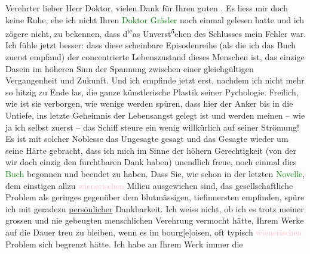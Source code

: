 \pstart
           Verehrter lieber Herr Doktor, vielen Dank für Ihren guten \label{K_L03662-1v}\label{K_L03662-1h}. Es liess mir doch keine Ruhe, ehe ich nicht Ihren \textcolor{green}{Doktor Gräsler}{}\ledrightnote{\textcolor{green}{Doktor Gräsler, Badearzt}} noch einmal gelesen hatte und ich zögere
               nicht, zu bekennen, dass d\substVorne{}\textsuperscript{ie}\substDazwischen{}as\substHinten{} Unverst\substVorne{}\textsuperscript{ä}\substDazwischen{}ehen\substHinten{} des Schlusses mein Fehler war. Ich fühle 
               jetzt besser: dass diese scheinbare Episodenreihe (als die ich das Buch zuerst
               empfand) der concentrierte Lebenszustand dieses Menschen ist, das einzige Dasein im
               höheren Sinn der Spannung zwischen einer gleichgültigen Vergangenheit und Zukunft.
               Und ich empfinde jetzt erst, nachdem ich nicht mehr so hitzig zu Ende las, die ganze
                  {\pb}künstlerische Plastik seiner
               Pychologie. Freilich, wie ist sie verborgen, wie wenige werden spüren, dass hier der
               Anker bis in die Untiefe, ins letzte Geheimnis der Lebensangst gelegt ist und werden
               meinen – wie ja ich selbst zuerst – das Schiff steure ein wenig willkürlich auf
               seiner Strömung! Es ist mit solcher Noblesse das Ungesagte gesagt und das Gesagte
               wieder um seine Härte gebracht, dass ich mich im Sinne der höhern Gerechtigkeit (von
               der wir doch einzig den furchtbaren Dank haben) unendlich freue, noch einmal dies \textcolor{green}{Buch}{}\ledrightnote{{$\rightarrow$}\textcolor{green}{Doktor Gräsler, Badearzt}} begonnen und beendet zu
               haben. Dass Sie, wie schon in der letzten \textcolor{green}{Novelle}{}\ledrightnote{{$\rightarrow$}\textcolor{green}{Frau Beate und ihr Sohn. Novelle}}, dem einsti{\pb}gen allzu \textcolor{pink}{wienerischen}{}\ledrightnote{\textcolor{pink}{Wien}} Milieu ausgewichen sind, das gesellschaftliche Problem als
               geringes gegenüber dem blutmässigen, tiefinnersten empfinden, spüre ich mit geradezu
                  \uline{persönlicher} Dankbarkeit. Ich weiss nicht, ob ich
               es trotz meiner grossen und nie gebeugten menschlichen Verehrung vermocht hätte,
               Ihrem Werke auf die Dauer treu zu bleiben, wenn es im
               bourg{[}e{]}oisen, oft typisch \textcolor{pink}{wienerischen}{}\ledrightnote{\textcolor{pink}{Wien}} Problem sich begrenzt hätte. Ich habe an Ihrem Werk immer die
